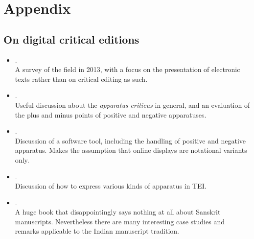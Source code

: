 \section*{Appendix}
\subsection{On digital critical editions}

\begin{itemize}
    \item {}. \\ A survey of the field in 2013, with a focus on
    the presentation of electronic texts rather than on critical editing as such.
    
    \item {}. \\ Useful discussion about the \emph{apparatus criticus}
    in general, and an evaluation of the plus and minus points of positive and
    negative apparatuses. 
    
    \item {}. \\ Discussion of a software tool, including the
    handling of positive and negative apparatus.  Makes the assumption that online
    displays are notational variants only.
    
    \item {}.  \\ Discussion of how to express various kinds of apparatus in 
    TEI.
    
    \item {}. \\ A huge book that disappointingly says nothing at all about 
    Sanskrit manuscripts.  Nevertheless there are many interesting case studies and remarks 
    applicable to the Indian manuscript tradition.
    
\end{itemize}

